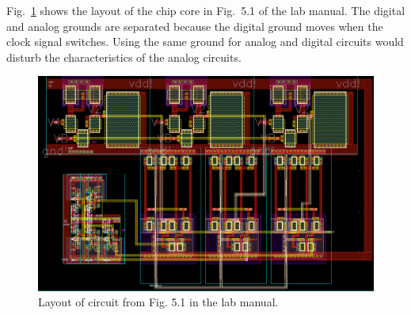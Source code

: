 Fig.~\ref{fig:cell_layout} shows the layout of the chip core in Fig.~5.1 of the lab manual. The digital and analog grounds
are separated because the digital ground moves when the clock signal switches. Using the same ground for analog and digital
circuits would disturb the characteristics of the analog circuits.
\begin{figure}
    \center
    \includegraphics[angle=90,width=\textwidth]{cell_layout.png}
    \caption{Layout of circuit from Fig. 5.1 in the lab manual.}
    \label{fig:cell_layout}
\end{figure}


